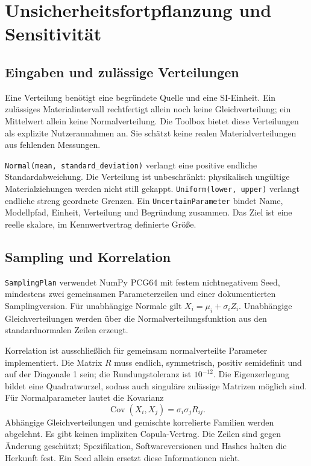 \chapter{Unsicherheitsfortpflanzung und Sensitivität}
\section{Eingaben und zulässige Verteilungen}
Eine Verteilung benötigt eine begründete Quelle und eine SI-Einheit.
Ein zulässiges Materialintervall rechtfertigt allein noch keine Gleichverteilung;
ein Mittelwert allein keine Normalverteilung. Die Toolbox bietet diese
Verteilungen als explizite Nutzerannahmen an. Sie schätzt keine realen
Materialverteilungen aus fehlenden Messungen.

\texttt{Normal(mean, standard\_deviation)} verlangt eine positive endliche
Standardabweichung. Die Verteilung ist unbeschränkt: physikalisch ungültige
Materialziehungen werden nicht still gekappt. \texttt{Uniform(lower, upper)}
verlangt endliche streng geordnete Grenzen. Ein \texttt{UncertainParameter}
bindet Name, Modellpfad, Einheit, Verteilung und Begründung zusammen.
Das Ziel ist eine reelle skalare, im Kennwertvertrag definierte Größe.

\section{Sampling und Korrelation}
\texttt{SamplingPlan} verwendet NumPy PCG64 mit festem nichtnegativem Seed,
mindestens zwei gemeinsamen Parameterzeilen und einer dokumentierten
Samplingversion. Für unabhängige Normale gilt $X_i=\mu_i+\sigma_i Z_i$.
Unabhängige Gleichverteilungen werden über die Normalverteilungsfunktion
aus den standardnormalen Zeilen erzeugt.

Korrelation ist ausschließlich für gemeinsam normalverteilte Parameter
implementiert. Die Matrix $R$ muss endlich, symmetrisch, positiv semidefinit
und auf der Diagonale 1 sein; die Rundungstoleranz ist $10^{-12}$.
Die Eigenzerlegung bildet eine Quadratwurzel, sodass auch singuläre zulässige
Matrizen möglich sind. Für Normalparameter lautet die Kovarianz
\begin{equation}
 \operatorname{Cov}(X_i,X_j)=\sigma_i\sigma_jR_{ij}.
\end{equation}
Abhängige Gleichverteilungen und gemischte korrelierte Familien werden
abgelehnt. Es gibt keinen impliziten Copula-Vertrag. Die Zeilen sind gegen
Änderung geschützt; Spezifikation, Softwareversionen und Hashes halten die
Herkunft fest. Ein Seed allein ersetzt diese Informationen nicht.

